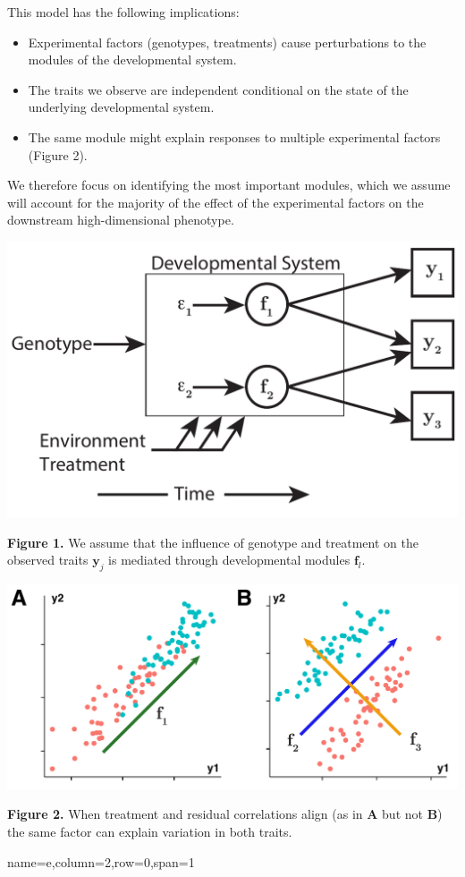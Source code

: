 \documentclass[landscape,paperwidth=48in,paperheight=36in,fontscale=0.35]{baposter}
\begin{document}
\begin{poster}
{This model has the following implications:
\begin{itemize}
\item Experimental factors (genotypes, treatments) cause perturbations to the modules of the developmental system.
\item The traits we observe are independent conditional on the state of the underlying developmental system.
\item The same module might explain responses to multiple experimental factors (Figure 2).
\end{itemize}

We therefore focus on identifying the most important modules, which we assume will account for the majority of the effect of the experimental factors on the downstream high-dimensional phenotype. 

\begin{multicols}{2}
\begin{center}
\includegraphics[width=0.825\columnwidth]{Figure1.pdf} 
\end{center}
\textbf{Figure 1.} We assume that the influence of genotype and treatment on the observed traits $\mathbf{y}_j$ is mediated through developmental modules $\mathbf{f}_l$.
\newpage
\begin{center}
\includegraphics[width=1\columnwidth]{Figure2.pdf} 
\end{center}
\textbf{Figure 2.} When treatment and residual correlations align (as in \textbf{A} but not \textbf{B}) the same factor can explain variation in both traits.
\end{multicols}
}
 {name=e,column=2,row=0,span=1}{
}
\end{poster}
\end{document}
